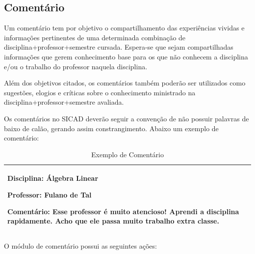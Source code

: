 \documentclass[12pt, a4paper]{report}
\begin{document}
\subsection{Comentário}
Um comentário tem por objetivo o compartilhamento das experiências vividas e informações pertinentes de uma determinada combinação de disciplina+professor+semestre cursada. Espera-se que sejam compartilhadas informações que gerem conhecimento base para os que não conhecem a disciplina e/ou o trabalho do professor naquela disciplina.

Além dos objetivos citados, os comentários também poderão ser utilizados como sugestões, elogios e críticas sobre o conhecimento ministrado na disciplina+professor+semestre avaliada.

Os comentários no \ac{SICAD} deverão seguir a convenção de não possuir palavras de baixo de calão, gerando assim constrangimento. Abaixo um exemplo de comentário:

\begin{table}[h]
 \centering
 {\renewcommand\arraystretch{1.25}
 \begin{tabular}{ l l }
  \cline{1-1}\cline{2-2}  
    \multicolumn{1}{|p{7.850cm}|}{\par \textbf{Disciplina:} Álgebra Linear
    \par \textbf{Professor:} Fulano de Tal
    \par \textbf{Comentário:} Esse professor é muito atencioso! Aprendi a disciplina rapidamente. Acho que ele passa muito trabalho extra classe.}
  \\  
  \hline
 \end{tabular}}
 \caption{Exemplo de Comentário}
\end{table}

O módulo de comentário possui as seguintes ações:
\end{document}
